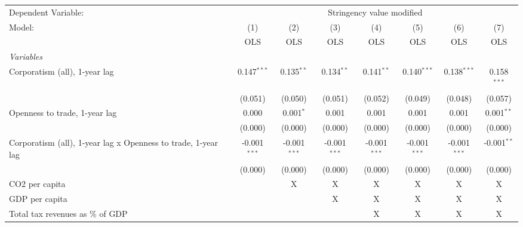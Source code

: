 
\begingroup
\centering
\begin{tabular}{lccccccc}
   \toprule
   Dependent Variable: & \multicolumn{7}{c}{Stringency value modified}\\
   Model:                                                        & (1)            & (2)            & (3)            & (4)            & (5)            & (6)            & (7)\\  
                                                                 &  OLS           & OLS            & OLS            & OLS            & OLS            & OLS            & OLS\\  
   \midrule
   \emph{Variables}\\
   Corporatism (all), 1-year lag                                 & 0.147$^{***}$  & 0.135$^{**}$   & 0.134$^{**}$   & 0.141$^{**}$   & 0.140$^{***}$  & 0.138$^{***}$  & 0.158$^{***}$\\   
                                                                 & (0.051)        & (0.050)        & (0.051)        & (0.052)        & (0.049)        & (0.048)        & (0.057)\\   
   Openness to trade, 1-year lag                                 & 0.000          & 0.001$^{*}$    & 0.001          & 0.001          & 0.001          & 0.001          & 0.001$^{**}$\\   
                                                                 & (0.000)        & (0.000)        & (0.000)        & (0.000)        & (0.000)        & (0.000)        & (0.000)\\   
   Corporatism (all), 1-year lag x Openness to trade, 1-year lag & -0.001$^{***}$ & -0.001$^{***}$ & -0.001$^{***}$ & -0.001$^{***}$ & -0.001$^{***}$ & -0.001$^{***}$ & -0.001$^{**}$\\   
                                                                 & (0.000)        & (0.000)        & (0.000)        & (0.000)        & (0.000)        & (0.000)        & (0.000)\\   
   CO2 per capita                                                &                & X              & X              & X              & X              & X              & X\\  
   GDP per capita                                                &                &                & X              & X              & X              & X              & X\\  
   Total tax revenues as \% of GDP                               &                &                &                & X              & X              & X              & X\\  

\end{tabular}
